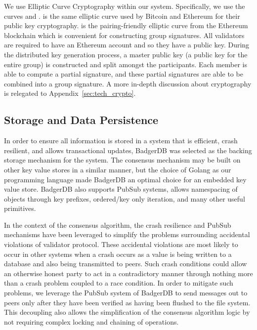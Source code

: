 We use Elliptic Curve Cryptography within our system.
Specifically, we use the curves \secp{} and \bnEth{}.
\secp{} is the same elliptic curve used by Bitcoin and Ethereum
for their public key cryptography.
\bnEth{} is the pairing-friendly elliptic curve from the Ethereum
blockchain which is convenient for constructing group signatures.
All validators are required to have an Ethereum account and so they
have a \secp{} public key.
During the distributed key generation process, a master public key (a
public key for the entire group) is constructed and split amongst the
participants.
Each member is able to compute a partial signature, and these partial
signatures are able to be combined into a group signature.
A more in-depth discussion about cryptography is relegated to
Appendix~\ref{sec:tech_crypto}.


\subsection{Storage and Data Persistence}

In order to ensure all information is stored in a system that is
efficient, crash resilient, and allows transactional updates, BadgerDB
was selected as the backing storage mechanism for the system.
The consensus mechanism may be built on other key value stores in a
similar manner, but the choice of Golang as our programming language
made BadgerDB an optimal choice for an embedded key value store.
BadgerDB also supports PubSub systems, allows namespacing of objects
through key prefixes, ordered/key only iteration, and many other useful
primitives.

In the context of the consensus algorithm, the crash resilience and
PubSub mechanisms have been leveraged to simplify the problems
surrounding accidental violations of validator protocol.
These accidental violations are most likely to occur in other systems
when a crash occurs as a value is being written to a database and also
being transmitted to peers.
Such crash conditions could allow an otherwise honest party to act in a
contradictory manner through nothing more than a crash problem coupled
to a race condition.
In order to mitigate such problems, we leverage the PubSub system of
BadgerDB to send messages out to peers only after they have been
verified as having been flushed to the file system.
This decoupling also allows the simplification of the consensus
algorithm logic by not requiring complex locking and chaining of
operations.

